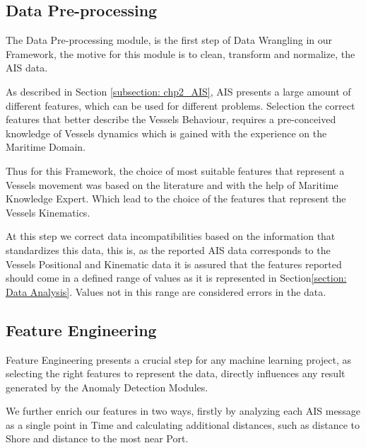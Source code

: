 \subsection{Data Pre-processing}
The Data Pre-processing module, is the first step of Data Wrangling in our Framework, the motive for this module is to clean, transform and normalize, the AIS data.

As described in Section \ref{subsection: chp2_AIS},  AIS presents a large amount of different features, which can be used for different problems. Selection the correct features that better describe the Vessels Behaviour,  requires a pre-conceived knowledge of Vessels dynamics which is gained with the experience on the Maritime Domain. 


Thus for this Framework, the choice of most suitable features that represent a Vessels movement was based on the literature and with the help of Maritime Knowledge Expert. Which lead to the choice of the features that represent the Vessels Kinematics.

At this step we correct data incompatibilities based on the information that standardizes this data, this is, as the reported AIS data corresponds to the Vessels Positional and Kinematic data it is assured that the features reported should come in a defined range of values as it is represented in Section\ref{section: Data Analysis}. Values not in this range are considered errors in the data. 



\subsection{Feature Engineering}
Feature Engineering presents a crucial step for any machine learning project, as selecting the right features to represent the data, directly influences any result generated by the Anomaly Detection Modules.  




We further enrich our features in two ways, firstly by analyzing each AIS message as a single point in Time and calculating additional distances, such as distance to Shore and distance to the most near Port.


